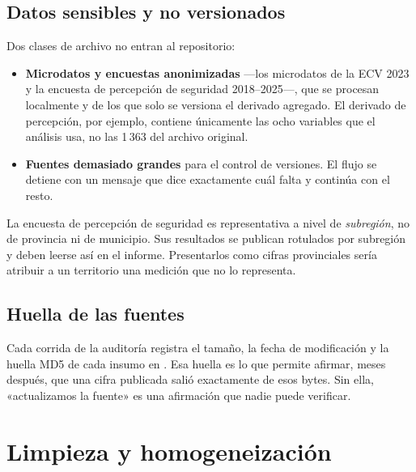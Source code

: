 \documentclass[11pt,a4paper]{article}
\begin{document}
\subsection{Datos sensibles y no versionados}

Dos clases de archivo no entran al repositorio:

\begin{itemize}[leftmargin=*, itemsep=2pt]
  \item \textbf{Microdatos y encuestas anonimizadas} —los microdatos de la ECV
    2023 y la encuesta de percepción de seguridad 2018--2025—, que se procesan
    localmente y de los que solo se versiona el derivado agregado. El derivado
    de percepción, por ejemplo, contiene únicamente las ocho variables que el
    análisis usa, no las 1\,363 del archivo original.
  \item \textbf{Fuentes demasiado grandes} para el control de versiones. El
    flujo se detiene con un mensaje que dice exactamente cuál falta y continúa
    con el resto.
\end{itemize}

\begin{regla}[title={Regla 4 — la encuesta de percepción no es provincial}]
La encuesta de percepción de seguridad es representativa a nivel de
\emph{subregión}, no de provincia ni de municipio. Sus resultados se publican
rotulados por subregión y deben leerse así en el informe. Presentarlos como
cifras provinciales sería atribuir a un territorio una medición que no lo
representa.
\end{regla}

\subsection{Huella de las fuentes}

Cada corrida de la auditoría registra el tamaño, la fecha de modificación y la
huella MD5 de cada insumo en
. Esa huella es lo que
permite afirmar, meses después, que una cifra publicada salió exactamente de
esos bytes. Sin ella, «actualizamos la fuente» es una afirmación que nadie puede
verificar.

\section{Limpieza y homogeneización}
\end{document}
